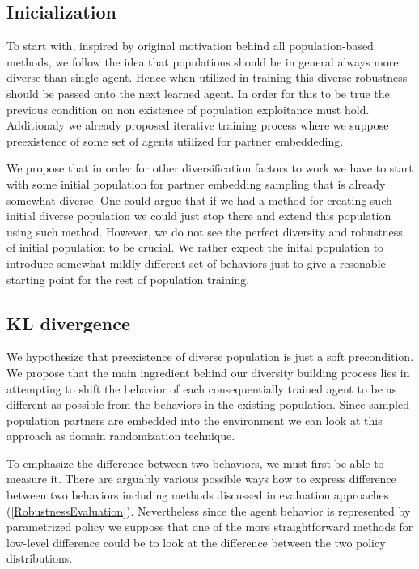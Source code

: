 \subsection{Inicialization}
To start with, inspired by original motivation behind all population-based methods, we follow the idea that populations should be in general always more diverse than single agent.
Hence when utilized in training this diverse robustness should be passed onto the next learned agent.
In order for this to be true the previous condition on non existence of population exploitance must hold.
Additionaly we already proposed iterative training process where we suppose preexistence of some set of agents utilized for partner embeddeding.

We propose that in order for other diversification factors to work we have to start with some initial population for partner embedding sampling that is already somewhat diverse.
One could argue that if we had a method for creating such initial diverse population we could just stop there and extend this population using such method.
However, we do not see the perfect diversity and robustness of initial population to be crucial. 
We rather expect the inital population to introduce somewhat mildly different set of behaviors just to give a resonable starting point for the rest of population training.

\subsection{KL divergence}
We hypothesize that preexistence of diverse population is just a soft precondition.
We propose that the main ingredient behind our diversity building process lies in attempting to shift the behavior of each consequentially trained agent to be as different as possible from the behaviors in the existing population.
Since sampled population partners are embedded into the environment we can look at this approach as domain randomization technique.


To emphasize the difference between two behaviors, we must first be able to measure it.
There are arguably various possible ways how to express difference between two behaviors including methods discussed in evaluation approaches (\ref{RobustnessEvaluation}).
Nevertheless since the agent behavior is represented by parametrized policy we suppose that one of the more straightforward methods for low-level difference could be to look at the difference between the two policy distributions.

